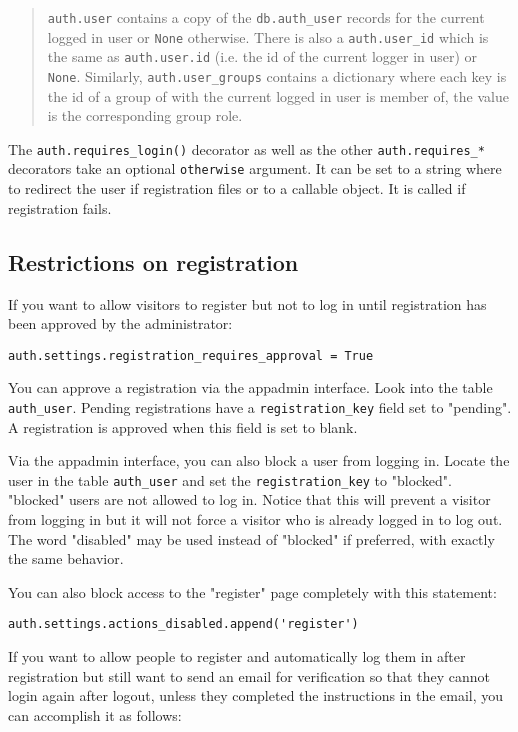\documentclass[justified,sixbynine,notoc]{tufte-book}
\def\ft{\small\tt}
\def\inxx#1{\index{#1}}
\begin{document}
\begin{fullwidth}
\begin{quote}{\ft auth.user} contains a copy of the {\ft db.auth\_user} records for the current logged in user or {\ft None} otherwise. There is also a {\ft auth.user\_id} which is the same as {\ft auth.user.id} (i.e. the id of the current logger in user) or {\ft None}. Similarly, {\ft auth.user\_groups} contains a dictionary where each key is the id of a group of with the current logged in user is member of, the value is the corresponding group role.\end{quote}
\inxx{otherwise}

The {\ft auth.requires\_login()} decorator as well as the other {\ft auth.requires\_*} decorators take an optional {\ft otherwise} argument. It can be set to a string where to redirect the user if registration files or to a callable object. It is called if registration fails.

\goodbreak\subsection{Restrictions on registration}

If you want to allow visitors to register but not to log in until registration has been approved by the administrator:
\begin{lstlisting}
auth.settings.registration_requires_approval = True
\end{lstlisting}

You can approve a registration via the appadmin interface. Look into the table {\ft auth\_user}. Pending registrations have a {\ft registration\_key} field set to "pending". A registration is approved when this field is set to blank.

Via the appadmin interface, you can also block a user from logging in. Locate the user in the table {\ft auth\_user} and set the {\ft registration\_key} to "blocked". "blocked" users are not allowed to log in. Notice that this will prevent a visitor from logging in but it will not force a visitor who is already logged in to log out. The word "disabled" may be used instead of "blocked" if preferred, with exactly the same behavior.

You can also block access to the "register" page completely with this statement:
\begin{lstlisting}
auth.settings.actions_disabled.append('register')
\end{lstlisting}

If you want to allow people to register and automatically log them in after registration but still want to send an email for verification so that they cannot login again after logout, unless they completed the instructions in the email, you can accomplish it as follows:


\end{fullwidth}
\end{document}
